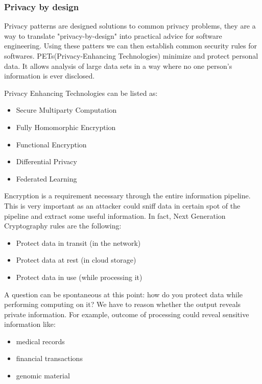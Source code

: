 \subsubsection{Privacy by design}

 Privacy patterns are designed solutions to common privacy problems, they are a way to translate "privacy-by-design" into practical advice for software engineering. Using these patters we can then establish common security rules for softwares.\newline
 PETs(Privacy-Enhancing Technologies) minimize and protect personal data. It allows analysis of large data sets in a way where no one person's information is ever disclosed. 

 Privacy Enhancing Technologies can be listed as: 

 \begin{itemize}
     \item Secure Multiparty Computation
     \item Fully Homomorphic Encryption 
     \item Functional Encryption 
     \item Differential Privacy 
     \item Federated Learning 
 \end{itemize}

Encryption is a requirement necessary through the entire information pipeline. This is very important as an attacker could sniff data in certain spot of the pipeline and extract some useful information. 
In fact, Next Generation Cryptography rules are the following: 

\begin{itemize}
    \item Protect data in transit (in the network)
    \item Protect data at rest (in cloud storage) 
    \item Protect data in use (while processing it)
\end{itemize}

A question can be spontaneous at this point: how do you protect data while performing computing on it?\newline
We have to reason whether the output reveals private information. For example, outcome of processing could reveal sensitive information like: 
\begin{itemize}
    \item medical records
    \item financial transactions
    \item genomic material
\end{itemize}


